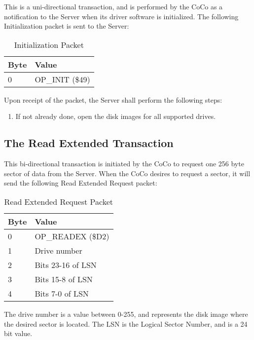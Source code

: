\documentclass{article}
\begin{document}
This is a uni-directional transaction, and is performed by the CoCo as a notification to the Server when its driver software is initialized. The following Initialization packet is sent to the Server:

\begin{table}[ht]
\caption{Initialization Packet}
\begin{center}
\begin{tabular}{|ll|}
\hline
Byte & Value \\ \hline
0 & OP\_INIT (\$49) \\
\hline
\end{tabular}
\end{center}
\end{table}

Upon receipt of the packet, the Server shall perform the following steps:

\begin{enumerate}
\item If not already done, open the disk images for all supported drives.
\end{enumerate}

\subsection{The Read Extended Transaction}

This bi-directional transaction is initiated by the CoCo to request one 256 byte sector of data from the Server. When the CoCo desires to request a sector, it will send the following Read Extended Request packet:

\begin{table}[ht]
\caption{Read Extended Request Packet}
\begin{center}
\begin{tabular}{|ll|}
\hline
Byte & Value \\ \hline
0 & OP\_READEX (\$D2) \\
1 & Drive number \\
2 & Bits 23-16 of LSN \\
3 & Bits 15-8 of LSN \\
4 & Bits 7-0 of LSN \\
\hline
\end{tabular}
\end{center}
\end{table}

The drive number is a value between 0-255, and represents the disk image where the desired sector is located. The LSN is the Logical Sector Number, and is a 24 bit value.
\end{document}
